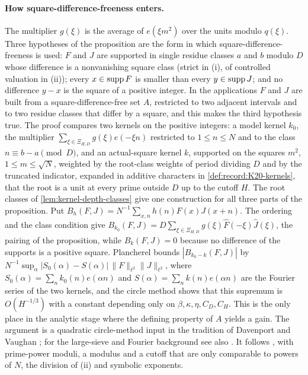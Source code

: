 \paragraph{How square-difference-freeness enters.}
The multiplier $g(\xi)$ is the average of $e(\xi m^2)$ over the units modulo
$q(\xi)$. Three hypotheses of the proposition are the form in which
square-difference-freeness is used: $F$ and $J$ are supported in single
residue classes $a$ and $b$ modulo $D$ whose difference is a nonvanishing
square class (strict in (i), of controlled valuation in (ii)); every $x\in\operatorname{supp} F$ is
smaller than every $y\in\operatorname{supp} J$; and no difference $y-x$ is the square of a
positive integer. In the applications $F$ and $J$ are built from a
square-difference-free set $A$, restricted to two adjacent intervals and to
two residue classes that differ by a square, and this makes the third
hypothesis true. The proof compares two kernels on the positive integers: a
model kernel $k_0$, the multiplier $\sum_{\xi\in\Xi_{H,D}}g(\xi)e(-\xi n)$
restricted to $1\le n\le N$ and to the class $n\equiv b-a\pmod D$, and an
actual-square kernel $k$, supported on the squares $m^2$, $1\le m\le\sqrt N$,
weighted by the root-class weights of period dividing $D$ and by the
truncated indicator, expanded in additive characters in
\cref{def:record:K20-kernels}, that the root is a unit at every prime
outside $D$ up to the cutoff $H$. The root classes of \cref{lem:kernel-depth-classes}
give one construction for all three parts of the proposition. Put
$B_h(F,J)=N^{-1}\sum_{x,n}h(n)F(x)J(x+n)$. The ordering and the class condition
give $B_{k_0}(F,J)=D\sum_{\xi\in\Xi_{H,D}}g(\xi)\widehat F(-\xi)\widehat J(\xi)$,
the pairing of the proposition, while $B_k(F,J)=0$ because no difference of
the supports is a positive square. Plancherel bounds $|B_{k_0-k}(F,J)|$ by
$N^{-1}\sup_\alpha|S_0(\alpha)-S(\alpha)|\,\|F\|_{\ell^2}\|J\|_{\ell^2}$, where
$S_0(\alpha)=\sum_nk_0(n)e(\alpha n)$ and
$S(\alpha)=\sum_nk(n)e(\alpha n)$ are the Fourier series of the
two kernels, and the circle method shows that this supremum is
$O(H^{-1/3})$ with a constant depending only on
$\beta,\kappa,\eta,C_D,C_H$. This is the only place in the
analytic stage where the defining property of $A$ yields a gain. The argument is a
quadratic circle-method input in the tradition of Davenport and Vaughan
\cite{Davenport00,Vaughan97}; for the large-sieve and Fourier background see
also \cite{MontgomeryVaughan,IwaniecKowalski}. It follows
\cite[Prop.~6.1]{OpenAI}, with prime-power moduli, a modulus and a cutoff that
are only comparable to powers of $N$, the division of (ii) and symbolic
exponents.

